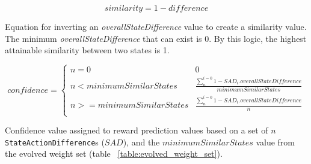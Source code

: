 \begin{capeq}
\begin{equation} \label{eq:diff_to_similarity}
  similarity = 1 - difference
\end{equation}
\caption[Difference to Similarity Inversion]{Equation for inverting an \textit{overallStateDifference} value to create a similarity value. The minimum \textit{overallStateDifference} that can exist is 0. By this logic, the highest attainable similarity between two states is 1.}
\end{capeq}

\begin{capeq}
\begin{equation} \label{eq:confidence}
  confidence = \begin{cases}
    n = 0 & 0 \\
    n < minimumSimilarStates & \frac{\sum_{n}^{i=0} 1 - SAD_{i}.overallStateDifference}{minimumSimilarStates} \\
    n >= minimumSimilarStates & \frac{\sum_{n}^{i=0} 1 - SAD_{i}.overallStateDifference}{n} \\
\end{cases}
\end{equation}
\caption[Reward Prediction Confidence]{Confidence value assigned to reward prediction values based on a set of $n$ \texttt{StateActionDifference}s ($SAD$), and the $minimumSimilarStates$ value from the evolved weight set (table ~\ref{table:evolved_weight_set}).}
\end{capeq}



